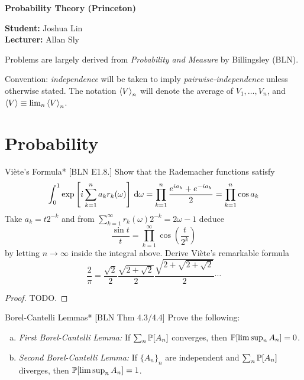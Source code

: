 





\begin{Large}
    \textsf{\textbf{Probability Theory (Princeton)}}
\end{Large}

\vspace{1ex}

\textsf{\textbf{Student:}} Joshua Lin \\
\textsf{\textbf{Lecturer:}} Allan Sly

\vspace{2ex}

Problems are largely derived from \emph{Probability and Measure} by Billingsley (BLN). 
\stdvspace

Convention: \emph{independence} will be taken to imply \emph{pairwise-independence} unless otherwise stated. The notation \(\ev{V}_n\) will denote the average of \(V_1, \dots, V_n\), and \(\ev{V} \equiv \lim_n \ev{V}_n\). 

\section{Probability}

\begin{problem}{Vi\`ete's Formula}*
    [BLN E1.8.] Show that the Rademacher functions satisfy 
    \[
        \int_0^1 \exp \left[ i \sum_{k=1}^n a_k r_k(\omega) \right] \, \mathrm{d} \omega
        = \prod_{k=1}^n \frac{e^{ia_k} + e^{-ia_k}}{2}
        = \prod_{k=1}^n \cos{a_k}
    \]
    Take \(a_k = t2^{-k}\) and from \(\sum_{k=1}^\infty r_k(\omega) 2^{-k} = 2\omega - 1\) deduce 
    \[
        \frac{\sin{t}}{t} = \prod_{k=1}^\infty \cos \left( \frac{t}{2^k} \right) 
    \]
    by letting \(n \to \infty\) inside the integral above. Derive Vi\`ete's remarkable formula
    \[
        \frac{2}{\pi} = \frac{\sqrt{2}}{2} \frac{\sqrt{2 + \sqrt{2}}}{2} \frac{\sqrt{2 + \sqrt{2 + \sqrt{2}}}}{2} \cdots
    \]
\end{problem}


\begin{proof}
    TODO. 
\end{proof}


\begin{problem}{Borel-Cantelli Lemmas}*
    [BLN Thm 4.3/4.4] Prove the following:
    \begin{enumerate}[(a)]
        \itemsep0em
        \item \emph{First Borel-Cantelli Lemma:} If \(\sum_n \mathbb{P}[A_n]\) converges, then \(\mathbb{P}[\limsup_n A_n] = 0\).
        \item \emph{Second Borel-Cantelli Lemma:} If \(\{A_n\}_n\) are independent and \(\sum_n \mathbb{P}[A_n]\) diverges, then \(\mathbb{P}[\limsup_n A_n] = 1\).
    \end{enumerate}
\end{problem}


